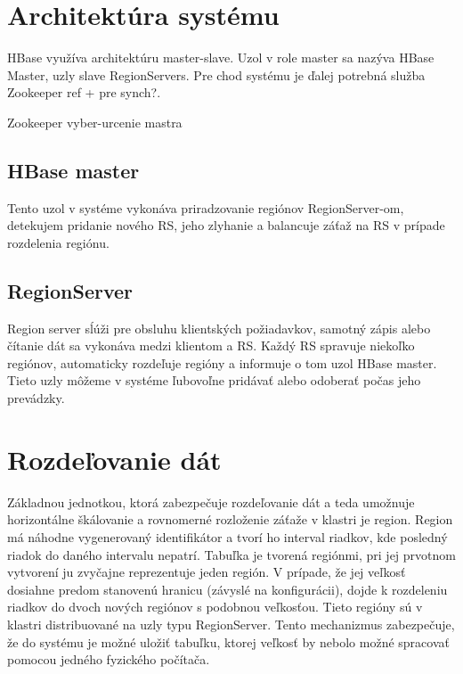 \documentclass[11pt,twoside,a4paper]{book}
\begin{document}

\section{Architektúra systému}

HBase využíva architektúru master-slave. Uzol v role master sa nazýva HBase Master, uzly slave RegionServers. Pre chod systému je ďalej potrebná služba Zookeeper {ref + pre synch?}. 

Zookeeper vyber-urcenie mastra

\subsection*{HBase master}

Tento uzol v systéme vykonáva priradzovanie regiónov RegionServer-om, detekujem pridanie nového RS, jeho zlyhanie a balancuje záťaž na RS v prípade rozdelenia regiónu.

\subsection*{RegionServer}

Region server sĺúži pre obsluhu klientských požiadavkov, samotný zápis alebo čítanie dát sa vykonáva medzi klientom a RS. Každý RS spravuje niekoľko regiónov, automaticky rozdeľuje regióny a informuje o tom uzol HBase master. Tieto uzly môžeme v systéme ľubovoľne pridávať alebo odoberať počas jeho prevádzky.


\section{Rozdeľovanie dát}

Základnou jednotkou, ktorá zabezpečuje rozdeľovanie dát a teda umožnuje horizontálne škálovanie a rovnomerné rozloženie záťaže v klastri je region. Region má náhodne vygenerovaný identifikátor a tvorí ho interval riadkov, kde posledný riadok do daného intervalu nepatrí. Tabuľka je tvorená regiónmi, pri jej prvotnom vytvorení ju zvyčajne reprezentuje jeden región. V prípade, že jej veľkosť dosiahne predom stanovenú hranicu (závyslé na konfigurácii), dojde k rozdeleniu riadkov do dvoch nových regiónov s podobnou veľkosťou. Tieto regióny sú  v klastri distribuované na uzly typu RegionServer. Tento mechanizmus zabezpečuje, že do systému je možné uložiť tabuľku, ktorej veľkosť by nebolo možné spracovať pomocou jedného fyzického počítača.
\end{document}
